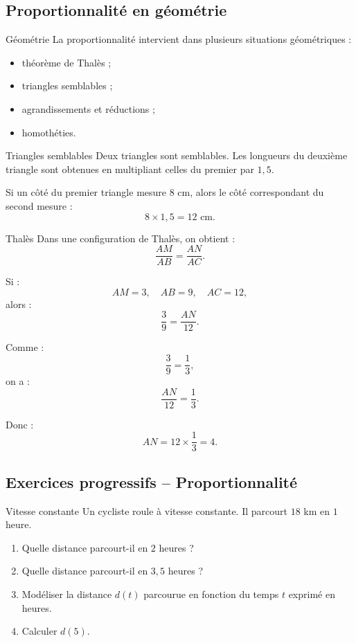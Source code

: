 \documentclass[11pt,a4paper]{article}
\begin{document}
\subsection{Proportionnalité en géométrie}

\begin{retenirbox}{Géométrie}
La proportionnalité intervient dans plusieurs situations géométriques :
\begin{itemize}
    \item théorème de Thalès ;
    \item triangles semblables ;
    \item agrandissements et réductions ;
    \item homothéties.
\end{itemize}
\end{retenirbox}

\begin{examplebox}{Triangles semblables}
Deux triangles sont semblables. Les longueurs du deuxième triangle sont obtenues en multipliant celles du premier par $1{,}5$.

Si un côté du premier triangle mesure $8$ cm, alors le côté correspondant du second mesure :
\[
8\times 1{,}5=12\text{ cm}.
\]
\end{examplebox}

\begin{examplebox}{Thalès}
Dans une configuration de Thalès, on obtient :
\[
\frac{AM}{AB}=\frac{AN}{AC}.
\]

Si :
\[
AM=3,\quad AB=9,\quad AC=12,
\]
alors :
\[
\frac{3}{9}=\frac{AN}{12}.
\]

Comme :
\[
\frac{3}{9}=\frac{1}{3},
\]
on a :
\[
\frac{AN}{12}=\frac{1}{3}.
\]

Donc :
\[
AN=12\times \frac{1}{3}=4.
\]
\end{examplebox}

\subsection{Exercices progressifs -- Proportionnalité}

\begin{exercisebox}{Vitesse constante}
Un cycliste roule à vitesse constante. Il parcourt $18$ km en $1$ heure.

\begin{enumerate}
    \item Quelle distance parcourt-il en $2$ heures ?
    \item Quelle distance parcourt-il en $3{,}5$ heures ?
    \item Modéliser la distance $d(t)$ parcourue en fonction du temps $t$ exprimé en heures.
    \item Calculer $d(5)$.
\end{enumerate}
\end{exercisebox}
\end{document}
